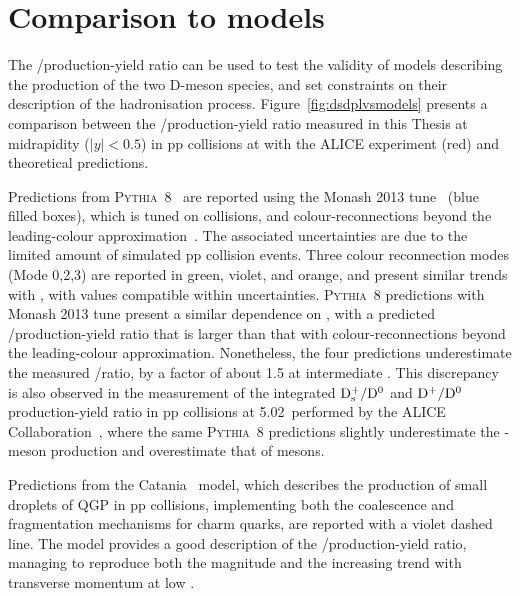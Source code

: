 \section{Comparison to models}
The \ds/\dpl production-yield ratio can be used to test the validity of models describing the production of the two D-meson species, and set constraints on their description of the hadronisation process. Figure~\ref{fig:dsdplvsmodels} presents a comparison between the \ds/\dpl production-yield ratio measured in this Thesis at midrapidity ($\lvert y\rvert<0.5$) in pp collisions at \thirteen with the ALICE experiment (red) and theoretical predictions. 

Predictions from \textsc{Pythia}~8~\cite{Bierlich:2022pfr} are reported using the Monash 2013 tune~\cite{Skands:2014pea} (blue filled boxes), which is tuned on \ee collisions, and colour-reconnections beyond the leading-colour approximation~\cite{Christiansen:2015yqa}. The associated uncertainties are due to the limited amount of simulated pp collision events. Three colour reconnection modes (Mode 0,2,3) are reported in green, violet, and orange, and present similar trends with \pt, with values compatible within uncertainties. \textsc{Pythia}~8 predictions with Monash 2013 tune present a similar dependence on \pt, with a predicted \ds/\dpl production-yield ratio that is larger than that with colour-reconnections beyond the leading-colour approximation. Nonetheless, the four predictions underestimate the measured \ds/\dpl ratio, by a factor of about 1.5 at intermediate \pt. This discrepancy is also observed in the measurement of the \pt integrated $\mathrm{D_s^+}/\mathrm{D^0}$ and $\mathrm{D^+}/\mathrm{D^0}$ production-yield ratio in pp collisions at 5.02~\tev performed by the ALICE Collaboration~\cite{ALICE:2021dhb}, where the same \textsc{Pythia}~8 predictions slightly underestimate the \ds-meson production and overestimate that of \dpl mesons.

Predictions from the Catania~\cite{Minissale:2020bif} model, which describes the production of small droplets of QGP in pp collisions, implementing both the coalescence and fragmentation mechanisms for charm quarks, are reported with a violet dashed line. The model provides a good description of the \ds/\dpl production-yield ratio, managing to reproduce both the magnitude and the increasing trend with transverse momentum at low \pt. 

